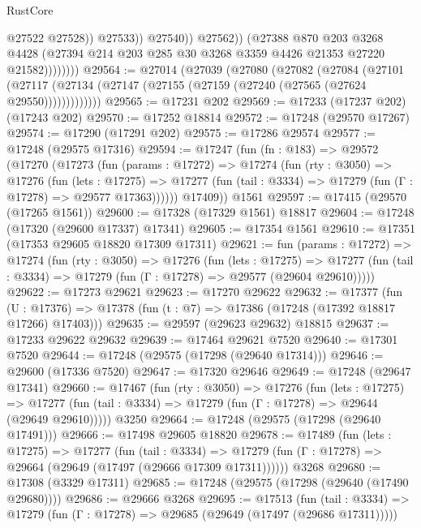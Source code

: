 \begin{lexlean}{RustCore}
\begin{coremodule}
                                @27522
                                @27528))
                            @27533))
                        @27540))
                    @27562))
                (@27388
                  @870
                  @203
                  @3268
                  @4428
                  (@27394 @214 @203 @285 @30 @3268 @3359 @4426 @21353 @27220 @21582))))))))
@29564 := @27014
    (@27039
      (@27080
        (@27082
          (@27084
            (@27101
              (@27117 (@27134 (@27147 (@27155 (@27159 (@27240 (@27565 (@27624 @29550)))))))))))))
@29565 := @17231 @202
@29569 := @17233 (@17237 @202) (@17243 @202)
@29570 := @17252 @18814
@29572 := @17248 (@29570 @17267)
@29574 := @17290 (@17291 @202)
@29575 := @17286 @29574
@29577 := @17248 (@29575 @17316)
@29594 := @17247
    (fun (fn : @183) =>
    @29572
      (@17270
        (@17273
          (fun (params : @17272) =>
          @17274
            (fun (rty : @3050) =>
            @17276
              (fun (lets : @17275) =>
              @17277 (fun (tail : @3334) => @17279 (fun (Γ : @17278) => @29577 @17363))))))
        @17409))
    @1561
@29597 := @17415 (@29570 (@17265 @1561))
@29600 := @17328 (@17329 @1561) @18817
@29604 := @17248 (@17320 (@29600 @17337) @17341)
@29605 := @17354 @1561
@29610 := @17351 (@17353 @29605 @18820 @17309 @17311)
@29621 := fun (params : @17272) =>
  @17274
    (fun (rty : @3050) =>
    @17276
      (fun (lets : @17275) =>
      @17277 (fun (tail : @3334) => @17279 (fun (Γ : @17278) => @29577 (@29604 @29610)))))
@29622 := @17273 @29621
@29623 := @17270 @29622
@29632 := @17377
    (fun (U : @17376) => @17378 (fun (t : @7) => @17386 (@17248 (@17392 @18817 @17266) @17403)))
@29635 := @29597 (@29623 @29632) @18815
@29637 := @17233 @29622 @29632
@29639 := @17464 @29621 @7520
@29640 := @17301 @7520
@29644 := @17248 (@29575 (@17298 (@29640 @17314)))
@29646 := @29600 (@17336 @7520)
@29647 := @17320 @29646
@29649 := @17248 (@29647 @17341)
@29660 := @17467
    (fun (rty : @3050) =>
    @17276
      (fun (lets : @17275) =>
      @17277 (fun (tail : @3334) => @17279 (fun (Γ : @17278) => @29644 (@29649 @29610)))))
    @3250
@29664 := @17248 (@29575 (@17298 (@29640 @17491)))
@29666 := @17498 @29605 @18820
@29678 := @17489
    (fun (lets : @17275) =>
    @17277
      (fun (tail : @3334) =>
      @17279 (fun (Γ : @17278) => @29664 (@29649 (@17497 (@29666 @17309 @17311))))))
    @3268
@29680 := @17308 (@3329 @17311)
@29685 := @17248 (@29575 (@17298 (@29640 (@17490 @29680))))
@29686 := @29666 @3268
@29695 := @17513
    (fun (tail : @3334) => @17279 (fun (Γ : @17278) => @29685 (@29649 (@17497 (@29686 @17311)))))

\end{coremodule}
\end{lexlean}

